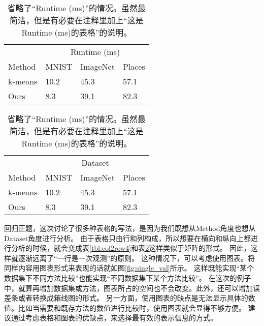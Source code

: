 \documentclass{article}
\newcommand{\Tref}[1]{表\ref{#1}}
\newcommand{\Fref}[1]{图\ref{#1}}
\begin{document}
\begin{table}[h]
    \begin{minipage}{0.48\linewidth}
        \centering
        \begin{tabular}{@{}llll@{}} \toprule
                   & \multicolumn{3}{c}{Runtime (ms)}  \\ \cmidrule(l){2-4}
            Method & MNIST & ImageNet & Places \\ \midrule
            k-means   & 10.2 & 45.3 & 57.1 \\ 
            Ours      & 8.3  & 39.1 & 82.3 \\ \bottomrule   
        \end{tabular}
        \caption{省略了“Dataset=”的情况。虽然变简洁了，但是哪里都没有关于“Dataset=”的信息。}
        \label{tbl:col2row4}
    \end{minipage}
    \hfill
    \begin{minipage}{0.48\linewidth}
        \centering
        \begin{tabular}{@{}llll@{}} \toprule
                   & \multicolumn{3}{c}{Dataset}  \\ \cmidrule(l){2-4}
            Method & MNIST & ImageNet & Places \\ \midrule
            k-means   & 10.2 & 45.3 & 57.1 \\ 
            Ours      & 8.3  & 39.1 & 82.3 \\ \bottomrule   
        \end{tabular}
        \caption{省略了“Runtime (ms)”的情况。虽然最简洁，但是有必要在注释里加上“这是Runtime (ms)的表格”的说明。}
        \label{tbl:col2row5}
    \end{minipage}
\end{table}


回归正题，这次讨论了很多种表格的写法，是因为我们既想从Method角度也想从Dataset角度进行分析。
由于表格只由行和列构成，所以想要在横向和纵向上都进行分析的时候，就会变成\Tref{tbl:col2row4}和\Tref{tbl:col2row5}这样类似于矩阵的形式。
因此，这样就逐渐远离了“一行是一次观测”的原则。
这种情况下，可以考虑使用图表。将同样内容用图表形式来表现的话就如\Fref{fig:single_val}所示。
这样既能实现“某个数据集下不同方法比较”也能实现“不同数据集下某个方法比较”。
在这次的例子中，就算再增加数据集或方法，图表所占的空间也不会改变。此外，还可以增加误差条或者转换成箱线图的形式。
另一方面，使用图表的缺点是无法显示具体的数值。比如当需要和既存方法的数值进行比较时，使用图表就会显得不够方便。
建议通过考虑表格和图表的优缺点，来选择最有效的表示信息的方式。
\end{document}
